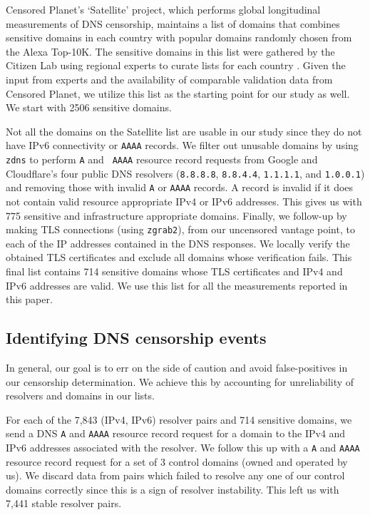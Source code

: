  Censored Planet's `Satellite' project,
which performs global longitudinal measurements of DNS censorship,
\cite{sundara2020censored} maintains a list of domains that combines sensitive
domains in each country with popular domains randomly chosen from the Alexa
Top-10K. The sensitive domains in this list were gathered by the Citizen Lab
using regional experts to curate lists for each country
\cite{citizenlab-blocklists}. Given the input from experts and the availability
of comparable validation data from Censored Planet, we utilize this list as the
starting point for our study as well. We start with 2506 sensitive domains.

 Not all the domains on the Satellite list
are usable in our study since they do not have IPv6 connectivity or {\tt AAAA}
records.
%
We filter out unusable domains by using {\tt zdns} to perform {\tt A} and {\tt
AAAA} resource record requests from Google and Cloudflare's four public DNS
resolvers ({\tt 8.8.8.8}, {\tt 8.8.4.4}, {\tt 1.1.1.1}, and {\tt 1.0.0.1}) and
removing those with invalid {\tt A} or {\tt AAAA} records. A record is invalid
if it does not contain valid resource appropriate IPv4 or IPv6 addresses. This
gives us with 775 sensitive and infrastructure appropriate domains.
%
Finally, we follow-up by making TLS connections (using {\tt zgrab2}), from our
uncensored vantage point, to each of the IP addresses contained in the DNS
responses. We locally verify the obtained TLS certificates and exclude all
domains whose verification fails. 
%
This final list contains 714 sensitive domains whose TLS certificates and IPv4
and IPv6 addresses are valid. We use this list for all the measurements
reported in this paper.

\subsection{Identifying DNS censorship events} \label{sec:methodology:censorship}
In general, our goal is to err on the side of caution and avoid false-positives
in our censorship determination. We achieve this by accounting for
unreliability of resolvers and domains in our lists.

For each of the 7,843 (IPv4, IPv6) resolver pairs and 714 sensitive domains, we
send a DNS {\tt A} and {\tt AAAA} resource record request for a domain to the
IPv4 and IPv6 addresses associated with the resolver. We follow this up with
a {\tt A} and {\tt AAAA} resource record request for a set of 3 control domains
(owned and operated by us).
%
We discard data from pairs which failed to resolve any one of our control
domains correctly since this is a sign of resolver instability. This left us
with 7,441 stable resolver pairs.
%

